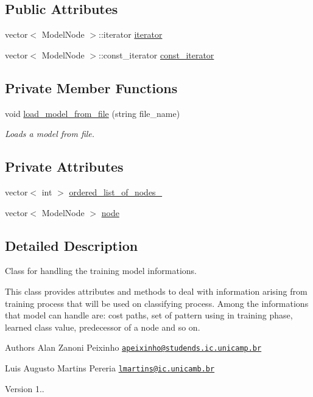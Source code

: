 \subsection*{Public Attributes}
\begin{DoxyCompactItemize}
\item 
vector$<$ Model\+Node $>$\+::iterator \hyperlink{classModel_a0cfbe847990e80cb9033e8a3257bced2}{iterator}
\item 
vector$<$ Model\+Node $>$\+::const\+\_\+iterator \hyperlink{classModel_a578f203623cdda48b577f10a8d6e12d4}{const\+\_\+iterator}
\end{DoxyCompactItemize}
\subsection*{Private Member Functions}
\begin{DoxyCompactItemize}
\item 
void \hyperlink{classModel_a020fe8b33fb2c430fe42a95e1ea83df4}{load\+\_\+model\+\_\+from\+\_\+file} (string file\+\_\+name)
\begin{DoxyCompactList}\small\item\em Loads a model from file. \end{DoxyCompactList}\end{DoxyCompactItemize}
\subsection*{Private Attributes}
\begin{DoxyCompactItemize}
\item 
vector$<$ int $>$ \hyperlink{classModel_a3324528ad5418b5d1a1a9a4b2a24e6e8}{ordered\+\_\+list\+\_\+of\+\_\+nodes\+\_\+}
\item 
vector$<$ Model\+Node $>$ \hyperlink{classModel_abf34f73f474d2eb05d2aa285cb88b828}{node}
\end{DoxyCompactItemize}


\subsection{Detailed Description}
Class for handling the training model informations. 

This class provides attributes and methods to deal with information arising from training process that will be used on classifying process. Among the informations that model can handle are\+: cost paths, set of pattern using in training phase, learned class value, predecessor of a node and so on. \begin{DoxyAuthor}{Authors}
Alan Zanoni Peixinho \href{mailto:apeixinho@studends.ic.unicamp.br}{\tt apeixinho@studends.\+ic.\+unicamp.\+br} 

Luis Augusto Martins Pereria \href{mailto:lmartins@ic.unicamb.br}{\tt lmartins@ic.\+unicamb.\+br} 
\end{DoxyAuthor}
\begin{DoxyVersion}{Version}
1.. 
\end{DoxyVersion}


